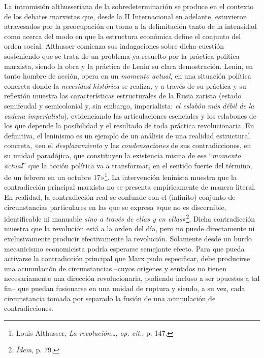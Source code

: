 La intromisión althusseriana de la sobredeterminación se produce en el contexto de los debates marxistas que, desde la II Internacional en adelante, estuvieron atravesados por la preocupación en torno a la delimitación tanto de la intensidad como acerca del modo en que la estructura económica define el conjunto del orden social. Althusser comienza sus indagaciones sobre dicha cuestión sosteniendo que se trata de un problema ya resuelto por la práctica política marxista, siendo la obra y la práctica de Lenin su clara demostración. Lenin, en tanto hombre de acción, opera en un \emph{momento actual}, en una situación política concreta donde la \emph{necesidad histórica} se realiza, y a través de su práctica y su reflexión muestra las características estructurales de la Rusia zarista (estado semifeudal y semicolonial y, sin embargo, imperialista: \emph{el eslabón más débil de la cadena imperialista}), evidenciando las articulaciones esenciales y los eslabones de los que depende la posibilidad y el resultado de toda práctica revolucionaria. En definitiva, el leninismo es un ejemplo de un análisis de una realidad estructural concreta, «en el \emph{desplazamiento} y las \emph{condensaciones} de sus contradicciones, en su unidad paradójica, que constituyen la existencia misma de ese ``\emph{momento actual}'' que la acción política va a transformar, en el sentido fuerte del término, de un febrero en un octubre 17»\footnote{Louis Althusser, \emph{La revolución\ldots{}}, \emph{op. cit.}, p. 147.}. La intervención leninista muestra que la contradicción principal marxista no se presenta empíricamente de manera literal. En realidad, la contradicción real se confunde con el (infinito) conjunto de circunstancias particulares en las que se expresa «que no es discernible, identificable ni manuable \emph{sino a través de ellas y en ellas}»\footnote{\emph{Ídem}, p. 79.}. Dicha contradicción muestra que la revolución está a la orden del día, pero no puede directamente ni exclusivamente producir efectivamente la revolución. Solamente desde un burdo mecanicismo economicista podría esperarse semejante efecto. Para que pueda activarse la contradicción principal que Marx pudo especificar, debe producirse una acumulación de circunstancias --cuyos orígenes y sentidos no tienen necesariamente una dirección revolucionaria, pudiendo incluso a ser opuestos a tal fin-- que puedan fusionarse en una unidad de ruptura y siendo, a su vez, cada circunstancia tomada por separado la fusión de una acumulación de contradicciones.

